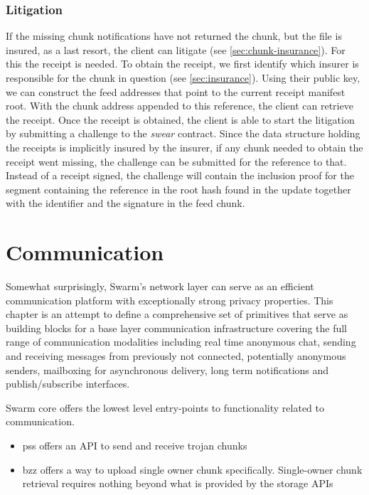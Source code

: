 \subsubsection{Litigation}

If the missing chunk notifications have not returned the chunk, but the file is insured, as a last resort, the client can litigate (see \ref{sec:chunk-insurance}). For this the receipt is needed. To obtain the receipt, we first identify which insurer is responsible for the chunk in question (see \ref{sec:insurance}). Using their public key, we can construct the feed addresses that point to the current receipt manifest root. With the chunk address appended to this reference, the client can retrieve the receipt. Once the receipt is obtained, the client is able to start the litigation by submitting a challenge to the \emph{swear} contract. Since the data structure holding the receipts  is implicitly insured by the insurer, if any chunk needed to obtain the receipt went missing, the challenge can be submitted for the reference to that. Instead of a receipt signed, the challenge will contain the inclusion proof for the segment containing the reference in the root hash found  in the update together with the identifier and the signature in the feed chunk. 

\section{Communication \statusred}\label{sec:messaging}


Somewhat surprisingly, Swarm's network layer can serve as  an efficient  communication platform with exceptionally strong privacy properties. This chapter is an attempt to define a comprehensive set of primitives that serve as building blocks for a base layer communication infrastructure covering the full range of communication modalities including real time anonymous chat, sending and receiving messages from previously not connected, potentially anonymous senders, mailboxing for asynchronous delivery, long term notifications and  publish/subscribe interfaces. 

Swarm core offers the lowest level entry-points to functionality related to communication.

\begin{itemize}
    \item pss offers an API to send and receive trojan chunks
    \item bzz offers a way to upload single owner chunk specifically. Single-owner chunk retrieval requires nothing beyond what is provided by the storage APIs
\end{itemize}



